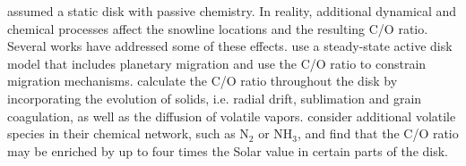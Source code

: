 \documentclass[apj]{emulateapj}
\newcommand{\emgr}[1]{\emph{ \color{gray} #1}}
\begin{document}


 
\citet{oberg11} assumed a static disk with passive chemistry. In reality, additional dynamical and chemical processes affect the snowline locations and the resulting C/O ratio. Several works have addressed some of these effects. \citet{madhu14} use a steady-state active disk model that includes planetary migration and use the C/O ratio to constrain migration mechanisms. \citealt{alidib14} calculate the C/O ratio throughout the disk by incorporating the evolution of solids, i.e. radial drift, sublimation and grain coagulation, as well as the diffusion of volatile vapors. \citet{thiabaud15} consider additional volatile species in their chemical network, such as N$_2$ or NH$_3$, and find that the C/O ratio may be enriched by up to four times the Solar value in certain parts of the disk.  
\end{document}
